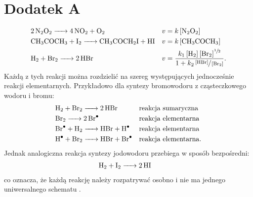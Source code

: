 \documentclass[10pt, a4paper, twoside, onecolumn]{article}
\numberwithin{equation}{section}
\begin{document}
	\section*{Dodatek A}\label{sec: dodatek A}
	\begin{align*}
		&\ce{2N2O2 -> 4NO2 + O2} &&v=k\left[\ce{N2O2}\right] \\
		&\ce{CH3COCH3 + I2 -> CH3COCH2I + HI} &&v=k\left[\ce{CH3COCH3}\right] \\
		&\ce{H2 + Br2 -> 2HBr} &&v=\frac{k_{1}\left[\ce{H2}\right]\left[\ce{Br2}\right]^{\sfrac{1}{2}}}{1+k_{2}\sfrac{\left[\ce{HBr}\right]}{\left[\ce{Br2}\right]}}.
	\end{align*}
	Każdą z tych reakcji można rozdzielić na szereg występujących jednocześnie reakcji elementarnych. Przykładowo dla syntezy bromowodoru z cząsteczkowego wodoru i bromu:
	\begin{align*}
		&\ce{H2 + Br2 -> 2HBr} &&\text{reakcja sumaryczna} \\
		&\ce{Br2 -> 2Br^{.}} &&\text{reakcja elementarna} \\
		&\ce{Br^{.} + H2 -> HBr + H^{.}} &&\text{reakcja elementarna} \\
		&\ce{H^{.} + Br2 -> HBr + Br^{.}} &&\text{reakcja elementarna}.
	\end{align*}
	Jednak analogiczna reakcja syntezy jodowodoru przebiega w sposób bezpośredni: 
	\begin{align*}
		&\ce{H2 + I2 -> 2HI}
	\end{align*}
	co oznacza, że każdą reakcję należy rozpatrywać osobno i nie ma jednego uniwersalnego schematu \cite{pigon1}.
	
\end{document}
